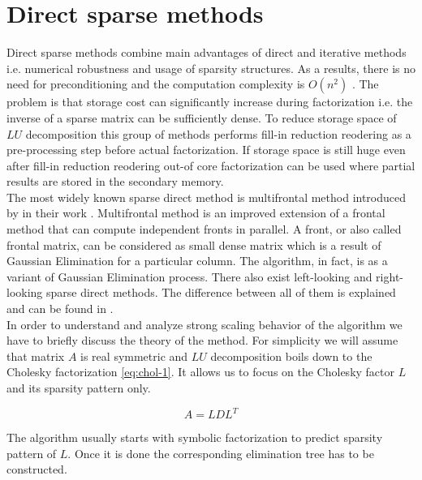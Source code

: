 \section{Direct sparse methods}
\label{subseq:sparse methods}

Direct sparse methods combine main advantages of direct and iterative methods i.e. numerical robustness and usage of sparsity structures. As a results, there is no need for preconditioning and the computation complexity is $O(n^2)$ \cite{complexity-of-spdm}. The problem is that storage cost can significantly increase during factorization i.e. the inverse of a sparse matrix can be sufficiently dense. To reduce storage space of $LU$ decomposition this group of methods performs fill-in reduction reodering as a pre-processing step before actual factorization. If storage space is still huge even after fill-in reduction reodering out-of core factorization can be used where partial results are stored in the secondary memory. \\

The most widely known sparse direct method is multifrontal method introduced by \citeauthor{mult-frontal-original:1} in their work \cite{mult-frontal-original:1}. Multifrontal method is an improved extension of a frontal method \cite{frontal-original} that can compute independent fronts in parallel. A front, or also called frontal matrix, can be considered as small dense matrix which is a result of Gaussian Elimination for a particular column. The algorithm, in fact, is as a variant of Gaussian Elimination process. There also exist left-looking and right-looking sparse direct methods. The difference between all of them is explained and can be found in \cite{elimination-tree}.\\


In order to understand and analyze strong scaling behavior of the algorithm we have to briefly discuss the theory of the method. For simplicity we will assume that matrix $A$ is real symmetric and $LU$ decomposition boils down to the Cholesky factorization \ref{eq:chol-1}. It allows us to focus on the Cholesky factor $L$ and its sparsity pattern only.

\begin{equation} \label{eq:chol-1}
	A = LDL^T
\end{equation}

The algorithm usually starts with symbolic factorization to predict sparsity pattern of $L$. Once it is done the corresponding elimination tree has to be constructed.\\

